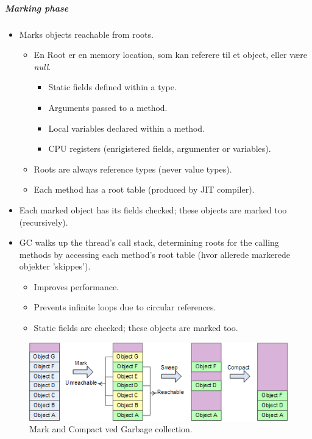 \subparagraph{Marking phase}
\begin{itemize}
	\item Marks objects reachable from roots.
	\begin{itemize}
			\item En Root er en memory location, som kan referere til et object, eller være \textit{null}.			
			\begin{itemize}
				\item Static fields defined within a type.
				\item Arguments passed to a method.
				\item Local variables declared within a method.
				\item CPU registers (enrigistered fields, argumenter or variables).
			\end{itemize}			
			\item Roots are always reference types (never value types).
			\item Each method has a root table (produced by JIT compiler).
	\end{itemize}	
	\item Each marked object has its fields checked; these objects are marked too (recursively).
	\item GC walks up the thread's call stack, determining roots for the calling methods by accessing each method's root table (hvor allerede markerede objekter 'skippes').
	\begin{itemize}
		\item Improves performance.
		\item Prevents infinite loops due to circular  references.
		\item Static fields are checked; these objects are marked too.
	\end{itemize}
\end{itemize}

\begin{figure}[h]
\centering
\includegraphics[width=0.8\linewidth]{figs/markandsweep}
\caption{Mark and Compact ved Garbage collection.}
\label{fig:markandsweep}
\end{figure}

